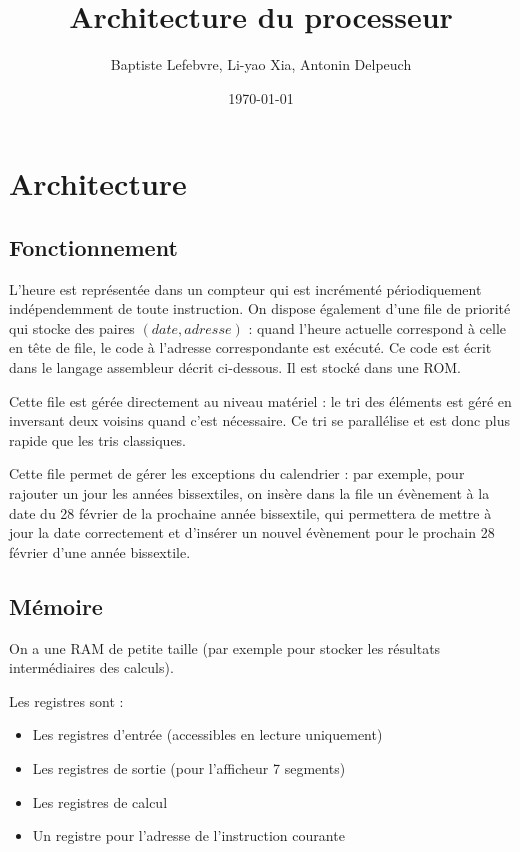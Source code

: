 \documentclass[a4paper]{article}
\begin{document}
\title{Architecture du processeur}
\author{Baptiste Lefebvre, Li-yao Xia, Antonin Delpeuch}
\date{\today}

\maketitle

\section{Architecture}

\subsection{Fonctionnement}

L'heure est représentée dans un compteur qui est incrémenté
périodiquement indépendemment de toute instruction.
On dispose également d'une file de priorité qui stocke des paires $(date,
adresse)$ : quand l'heure actuelle correspond à celle en tête de file, le
code à l'adresse correspondante est exécuté. Ce code est écrit dans le
langage assembleur décrit ci-dessous. Il est stocké dans une ROM.

Cette file est gérée directement au niveau matériel : le tri des éléments
est géré en inversant deux voisins quand c'est nécessaire. Ce tri se
parallélise et est donc plus rapide que les tris classiques.

Cette file permet de gérer les exceptions du calendrier : par exemple,
pour rajouter un jour les années bissextiles, on insère dans la file un
évènement à la date du 28 février de la prochaine année bissextile, qui permettera de
mettre à jour la date correctement et d'insérer un nouvel évènement pour
le prochain 28 février d'une année bissextile.

\subsection{Mémoire}

On a une RAM de petite taille (par exemple pour stocker les résultats
intermédiaires des calculs).

Les registres sont :
\begin{itemize}
\item Les registres d'entrée (accessibles en lecture uniquement)
\item Les registres de sortie (pour l'afficheur 7 segments)
\item Les registres de calcul
\item Un registre pour l'adresse de l'instruction courante
\end{itemize}
\end{document}
